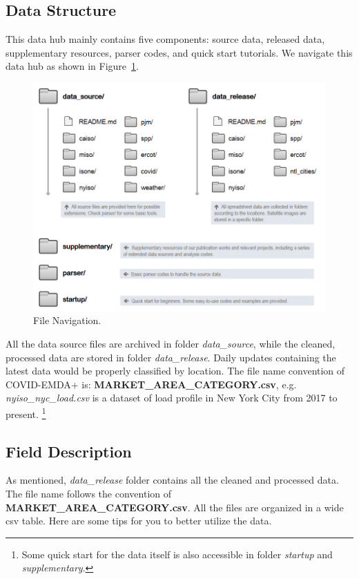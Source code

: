 \documentclass[10pt]{article}
\numberwithin{equation}{section}
\numberwithin{table}{section}
\numberwithin{figure}{section}
\begin{document}
\subsection{Data Structure}
This data hub mainly contains five components: source data, released data, supplementary resources, parser codes, and quick start tutorials. We navigate this data hub as shown in Figure~\ref{fig:filenavi}.
\begin{figure}[htbp]
	\centering
	\includegraphics[width=.8\textwidth]{figures/folder-structure-0725.png}
	\caption{File Navigation.}
	\label{fig:filenavi}
\end{figure}

All the data source files are archived in folder \textit{data\_source}, while the cleaned, processed data are stored in folder \textit{data\_release}. Daily updates containing the latest data would be properly classified by location. The file name convention of COVID-EMDA+ is: \textbf{MARKET\_AREA\_CATEGORY.csv}, e.g. \textit{nyiso\_nyc\_load.csv} is a dataset of load profile in New York City from 2017 to present.
\footnote{Some quick start for the data itself is also accessible in folder \textit{startup} and \textit{supplementary}.}

\subsection{Field Description}
As mentioned, \textit{data\_release} folder contains all the cleaned and processed data. The file name follows the convention of \textbf{MARKET\_AREA\_CATEGORY.csv}. 
All the files are organized in a wide csv table. Here are some tips for you to better utilize the data.
\end{document}
